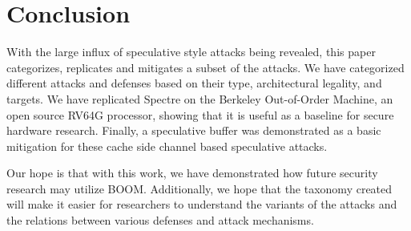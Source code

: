 \section{Conclusion} \label{Conclusion}

With the large influx of speculative style attacks being revealed, this paper categorizes,
replicates and mitigates a subset of the attacks. We have categorized different attacks 
and defenses based on their type, architectural legality, and targets. We have replicated 
Spectre on the Berkeley Out-of-Order Machine, an open source RV64G processor, showing that it
is useful as a baseline for secure hardware research. Finally, a speculative buffer was demonstrated
as a basic mitigation for these cache side channel based speculative attacks.

Our hope is that with this work, we have demonstrated how future security research may utilize BOOM.
Additionally, we hope that the taxonomy created will make it easier for researchers to understand
the variants of the attacks and the relations between various defenses and attack mechanisms.

